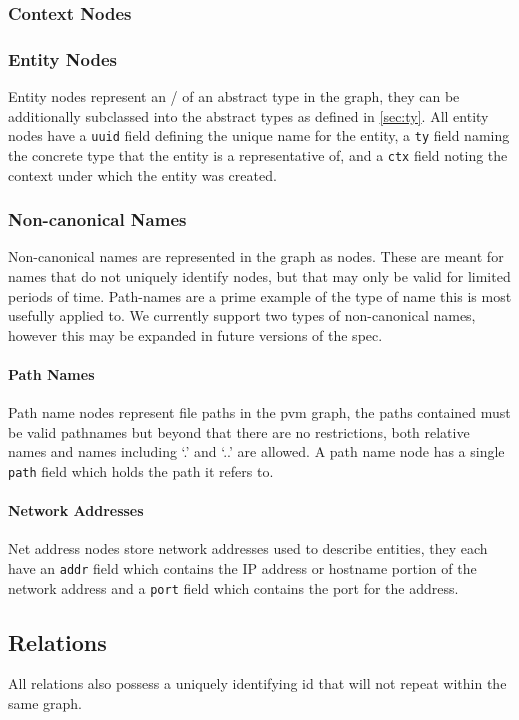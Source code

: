 \documentclass[12pt,twoside,a4paper]{article}
\newcommand{\field}[1]{\texttt{#1}}
\newcommand{\para}[1]{\paragraph{#1\\}}
\begin{document}
\subsubsection{Context Nodes}
\label{sec:gs:node:context}

\subsubsection{Entity Nodes}
\label{sec:gs:node:entity}
Entity nodes represent an \Entity/ of an abstract type in the graph, they can be additionally subclassed into the abstract types as defined in \autoref{sec:ty}. All entity nodes have a \field{uuid} field defining the unique name for the entity, a \field{ty} field naming the concrete type that the entity is a representative of, and a \field{ctx} field noting the context under which the entity was created.

\subsubsection{Non-canonical Names}
\label{sec:gs:node:name}
Non-canonical names are represented in the graph as nodes. These are meant for names that do not uniquely identify nodes, but that may only be valid for limited periods of time. Path-names are a prime example of the type of name this is most usefully applied to. We currently support two types of non-canonical names, however this may be expanded in future versions of the spec.

\para{Path Names}
\label{sec:gs:node:name:path}
Path name nodes represent file paths in the pvm graph, the paths contained must be valid pathnames but beyond that there are no restrictions, both relative names and names including `.' and `..' are allowed. A path name node has a single \field{path} field which holds the path it refers to.

\para{Network Addresses}
\label{sec:gs:node:name:net}
Net address nodes store network addresses used to describe entities, they each have an \field{addr} field which contains the IP address or hostname portion of the network address and a \field{port} field which contains the port for the address.

\subsection{Relations}
\label{sec:gs:rel}
All relations also possess a uniquely identifying id that will not repeat within the same graph.
\end{document}
